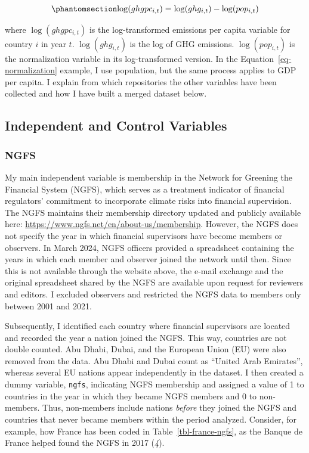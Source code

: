 \documentclass[
  12pt,
  letterpaper,
]{article}
\begin{document}
\begin{equation}\protect\phantomsection\label{eq-normalization}{
\log(ghgpc_{i,t}) = \log(ghg_{i,t}) - \log(pop_{i,t})
}\end{equation}

where \(\log(ghgpc_{i,t})\) is the log-transformed emissions per capita
variable for country \(i\) in year \(t\). \(\log(ghg_{i,t})\) is the log
of GHG emissions. \(\log(pop_{i,t})\) is the normalization variable in
its log-transformed version. In the Equation~\ref{eq-normalization}
example, I use population, but the same process applies to GDP per
capita. I explain from which repositories the other variables have been
collected and how I have built a merged dataset below.

\subsection{Independent and Control
Variables}\label{independent-and-control-variables}

\subsubsection{NGFS}\label{ngfs}

My main independent variable is membership in the Network for Greening
the Financial System (NGFS), which serves as a treatment indicator of
financial regulators' commitment to incorporate climate risks into
financial supervision. The NGFS maintains their membership directory
updated and publicly available here:
\url{https://www.ngfs.net/en/about-us/membership}. However, the NGFS
does not specify the year in which financial supervisors have become
members or observers. In March 2024, NGFS officers provided a
spreadsheet containing the years in which each member and observer
joined the network until then. Since this is not available through the
website above, the e-mail exchange and the original spreadsheet shared
by the NGFS are available upon request for reviewers and editors. I
excluded observers and restricted the NGFS data to members only between
2001 and 2021.

Subsequently, I identified each country where financial supervisors are
located and recorded the year a nation joined the NGFS. This way,
countries are not double counted. Abu Dhabi, Dubai, and the European
Union (EU) were also removed from the data. Abu Dhabi and Dubai count as
``United Arab Emirates'', whereas several EU nations appear
independently in the dataset. I then created a dummy variable,
\texttt{ngfs}, indicating NGFS membership and assigned a value of 1 to
countries in the year in which they became NGFS members and 0 to
non-members. Thus, non-members include nations \emph{before} they joined
the NGFS and countries that never became members within the period
analyzed. Consider, for example, how France has been coded in
Table~\ref{tbl-france-ngfs}, as the Banque de France helped found the
NGFS in 2017 (\emph{4}).
\end{document}
